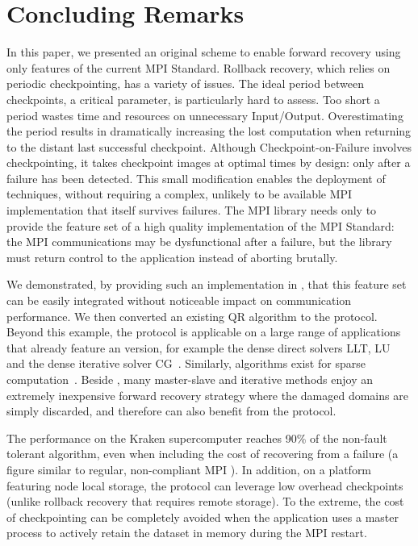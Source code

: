 \section{Concluding Remarks}

In this paper, we presented an original scheme to enable forward
recovery using only features of the current MPI Standard.
Rollback recovery, which relies on periodic checkpointing, has a variety
of issues. The ideal period between checkpoints, a critical parameter, is
particularly hard to assess. Too short a period wastes time and
resources on unnecessary Input/Output. Overestimating the period results
in dramatically increasing the lost computation when returning to the
distant last successful checkpoint. Although Checkpoint-on-Failure
involves checkpointing, it takes checkpoint images at optimal times by
design: only after a failure has been detected. This small modification
enables the deployment of \abft techniques, without requiring a complex,
unlikely to be available MPI implementation that itself survives
failures. The MPI library needs only to provide the feature set of a
high quality implementation of the MPI Standard: the MPI communications
may be dysfunctional after a failure, but the library must return
control to the application instead of aborting brutally.

We demonstrated, by providing such an implementation in \ompi, that this
feature set can be easily integrated without noticeable impact on
communication performance. We then converted an existing \abft QR
algorithm to the \cof protocol. Beyond this example, the \cof protocol
is applicable on a large range of applications that already feature an
\abft version, for example the dense direct solvers LLT,
LU~\cite{fthpl2011} and the dense iterative solver
CG~\cite{Chen:2005:FTH:1065944.1065973}. Similarly, \abft algorithms
exist for sparse computation~\cite{Shantharam:2012:FTP:2304576.2304588}.
Beside \abft, many master-slave and iterative methods enjoy an extremely
inexpensive forward recovery strategy where the damaged domains are
simply discarded, and therefore can also benefit from the \cof protocol.

The performance on the Kraken supercomputer reaches
90\% of the non-fault tolerant algorithm, even when including the cost
of recovering from a failure (a figure similar to regular, non-compliant MPI \abft). In addition, on a platform featuring node local storage, the
\cof protocol can leverage low overhead checkpoints (unlike rollback
recovery that requires remote storage). To the extreme, the cost of 
checkpointing can be completely avoided when the application uses a 
master process to actively retain the dataset in memory during the MPI 
restart. 

